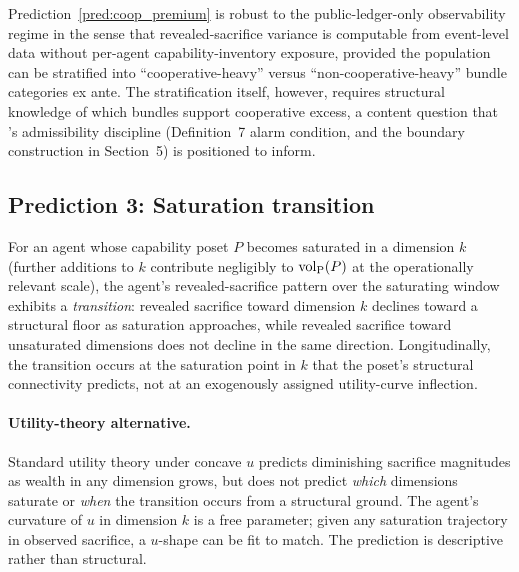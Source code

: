 \begin{remark}
\label{rem:coop_premium_op}
Prediction~\ref{pred:coop_premium} is robust to the
public-ledger-only observability regime in the sense that
revealed-sacrifice variance is computable from event-level data
without per-agent capability-inventory exposure, provided the
population can be stratified into ``cooperative-heavy'' versus
``non-cooperative-heavy'' bundle categories ex ante.  The
stratification itself, however, requires structural knowledge of
which bundles support cooperative excess, a content question that
\citep[Need~Sufficiency]{lasser2026paper8b}'s admissibility
discipline (Definition~7 alarm condition, and the boundary
construction in Section~5) is positioned to inform.
\end{remark}

\subsection{Prediction 3: Saturation transition}
\label{sec:pred_saturation}

\begin{prediction}
\label{pred:saturation}
For an agent whose capability poset $P$ becomes saturated in a
dimension $k$ (further additions to $k$ contribute negligibly to
${\operatorname{vol}_{\mathrm{P}}}(P)$ at the operationally relevant scale), the agent's
revealed-sacrifice pattern over the saturating window exhibits a
\emph{transition}: revealed sacrifice toward dimension $k$ declines
toward a structural floor as saturation approaches, while
revealed sacrifice toward unsaturated dimensions does not decline
in the same direction.  Longitudinally, the transition occurs at
the saturation point in $k$ that the poset's structural
connectivity predicts, not at an exogenously assigned utility-curve
inflection.
\end{prediction}

\paragraph{Utility-theory alternative.}
Standard utility theory under concave $u$ predicts diminishing
sacrifice magnitudes as wealth in any dimension grows, but does
not predict \emph{which} dimensions saturate or \emph{when} the
transition occurs from a structural ground.  The agent's curvature
of $u$ in dimension $k$ is a free parameter; given any saturation
trajectory in observed sacrifice, a $u$-shape can be fit to match.
The prediction is descriptive rather than structural.


